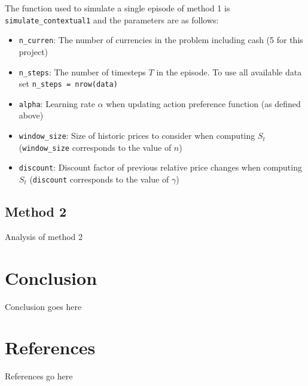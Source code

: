\documentclass[a4paper,12pt]{article}
\newcommand{\code}[1]{\texttt{#1}}
\begin{document}
The function used to simulate a single episode of method 1 is \code{simulate\_contextual1} and the parameters are as follows:
\begin{itemize}
  \item \code{n\_curren}: The number of currencies in the problem including cash (5 for this project)
  \item \code{n\_steps}: The number of timesteps $T$ in the episode. To use all available data set \code{n\_steps = nrow(data)}
  \item \code{alpha}: Learning rate $\alpha$ when updating action preference function (as defined above)
  \item \code{window\_size}: Size of historic prices to consider when computing $S_t$ (\code{window\_size} corresponds to the value of $n$)
  \item \code{discount}: Discount factor of previous relative price changes when computing $S_t$ (\code{discount} corresponds to the value of $\gamma$)
\end{itemize}



\subsection{Method 2}
Analysis of method 2

\section{Conclusion}
Conclusion goes here

\section{References}
References go here
\end{document}
